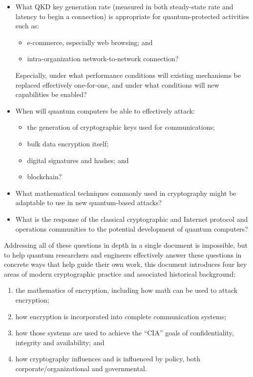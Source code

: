 \begin{itemize}
\item What QKD key generation rate (measured in both steady-state rate
  and latency to begin a connection) is appropriate for
  quantum-protected activities such as:
  \begin{itemize}
  \item e-commerce, especially web browsing; and
  \item intra-organization network-to-network connection?
  \end{itemize}
  Especially, under what performance conditions will existing mechanisms
  be replaced effectively one-for-one, and under what conditions will new
  capabilities be enabled?
\item When will quantum computers be able to effectively attack:
  \begin{itemize}
  \item the generation of cryptographic keys used for communications;
  \item bulk data encryption itself;
  \item digital signatures and hashes; and
  \item blockchain?
  \end{itemize}
\item What mathematical techniques commonly used in cryptography might
  be adaptable to use in new quantum-based attacks?
\item What is the response of the classical cryptographic and Internet
  protocol and operations communities to the potential development of
  quantum computers?
\end{itemize}

Addressing all of these questions in depth in a single document is
impossible, but to help quantum researchers and engineers effectively
answer these questions in concrete ways that help guide their own
work, this document introduces four key areas of modern cryptographic
practice and associated historical background:

\begin{enumerate}
\item the mathematics of encryption, including how math can be used to
  attack encryption;
\item how encryption is incorporated into complete communication
  systems;
\item how those systems are used to achieve the ``CIA'' goals of
  confidentiality, integrity and availability; and
\item how cryptography influences and is influenced by policy, both
  corporate/organizational and governmental.
\end{enumerate}

